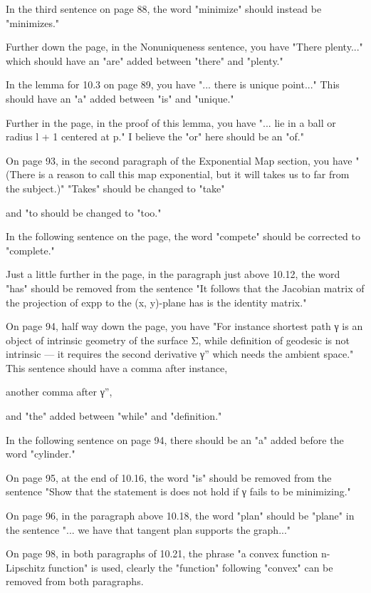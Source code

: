  In the third sentence on page 88, the word "minimize" should instead be "minimizes." 
 
 Further down the page, in the Nonuniqueness sentence, you have "There plenty..." which should have an "are" added between "there" and "plenty." 
 
 In the lemma for 10.3 on page 89, you have "... there is unique point..." This should have an "a" added between "is" and "unique." 
 
 Further in the page, in the proof of this lemma, you have "... lie in a ball or radius l + 1 centered at p." I believe the "or" here should be an "of." 
 
 On page 93, in the second paragraph of the Exponential Map section, you have "(There is a reason to call this map exponential, but it will takes us to far from the subject.)" "Takes" should be changed to "take" 
 
 and "to should be changed to "too." 
 
 In the following sentence on the page, the word "compete" should be corrected to "complete." 
 
 Just a little further in the page, in the paragraph just above 10.12, the word "has" should be removed from the sentence "It follows that the Jacobian matrix of the projection of expp to the (x, y)-plane has is the identity matrix." 
 
 On page 94, half way down the page, you have "For instance shortest path γ is an object of intrinsic geometry of the surface Σ, while definition of geodesic is not intrinsic — it requires the second derivative γ'' which needs the ambient space." This sentence should have a comma after instance, 
 
 another comma after γ'', 
 
 and "the" added between "while" and "definition." 
 
 In the following sentence on page 94, there should be an "a" added before the word "cylinder." 
 
 On page 95, at the end of 10.16, the word "is" should be removed from the sentence "Show that the statement is does not hold if γ fails to be minimizing." 
 
 On page 96, in the paragraph above 10.18, the word "plan" should be "plane" in the sentence "... we have that tangent plan supports the graph..." 
 
 On page 98, in both paragraphs of 10.21, the phrase "a convex function n-Lipschitz function" is used, clearly the "function" following "convex" can be removed from both paragraphs. 
 
